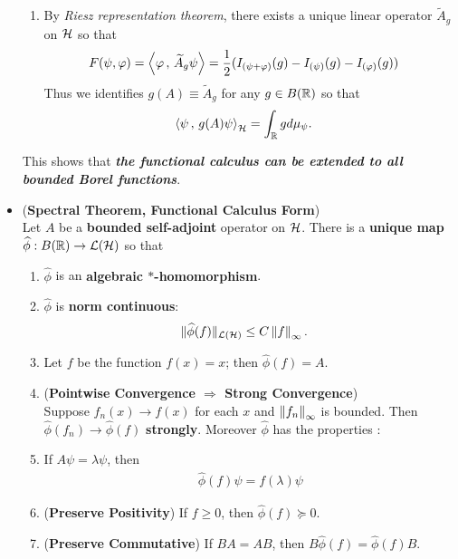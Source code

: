 \documentclass[11pt]{article}
\begin{document}
\begin{itemize}
\begin{remark}
\begin{enumerate}
\item By \emph{Riesz representation theorem}, there exists a unique linear operator $\widetilde{A}_g$ on ${\mathcal H}$ so that 
\begin{align*}
F(\psi, \varphi) = \left\langle \varphi\,,\, \widetilde{A}_{g}\psi \right\rangle &= \frac{1}{2} ( I_{(\psi+\varphi)}(g) - I_{(\psi)}(g) -  I_{(\varphi)}(g) )
\end{align*} Thus we identifies $g(A) \equiv \widetilde{A}_g$ for any $g \in B({\mathbb R})$ so that
\begin{align*}
\left\langle \psi\,,\, g(A)\psi \right\rangle_{{\mathcal H}} &= \int_{{\mathbb R}} g d\mu_{\psi}.
\end{align*}
\end{enumerate}
This shows that \emph{\textbf{the functional calculus can be extended to all bounded Borel functions}}.
\end{remark}


\item 
\begin{theorem} (\textbf{Spectral Theorem, Functional Calculus Form})    \citep{reed1980methods}\\
Let $A$ be a \textbf{bounded self-adjoint} operator on ${\mathcal H}$. There is a \textbf{unique map} $\widehat{\phi}: B({\mathbb R}) \to {\mathcal L}({\mathcal H})$ so that 
\begin{enumerate}
\item  $\widehat{\phi}$ is an \textbf{algebraic $*$-homomorphism}. 
\item  $\widehat{\phi}$ is \textbf{norm continuous}: 
\begin{align*}
\|\widehat{\phi}(f)\|_{{\mathcal L}({\mathcal H})} &\le C \left\|f\right\|_{\infty}.
\end{align*}
\item  Let $f$ be the function $f(x) = x$; then $\widehat{\phi}(f) = A$. 
\item  (\textbf{Pointwise Convergence $\Rightarrow$ Strong Convergence})\\
Suppose $f_n(x) \rightarrow f(x)$ for each $x$ and $\left\|f_n\right\|_{\infty}$ is bounded. Then  $\widehat{\phi}(f_n) \to \widehat{\phi}(f)$ \textbf{strongly}. Moreover $\widehat{\phi}$ has the properties : 
\item  If $A\psi = \lambda \psi$, then 
\begin{align}
\widehat{\phi}(f)\psi  = f(\lambda) \psi  \label{eqn: cont_functional_calculas_spectral_decomp_ext}
\end{align} 
\item (\textbf{Preserve Positivity})  If $f \ge 0$, then $\widehat{\phi}(f) \succeq 0$. 
\item (\textbf{Preserve Commutative})  If $BA = AB$, then $B\widehat{\phi}(f) = \widehat{\phi}(f)B$. 
\end{enumerate}
\end{theorem}


\end{itemize}
\end{document}
